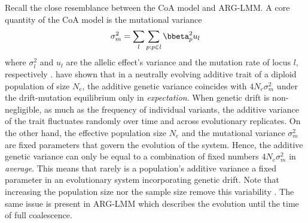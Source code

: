 Recall the close resemblance between the CoA model and ARG-LMM.
A core quantity of the CoA model is the mutational variance 
\begin{align}
\sigma_m^2 = \sum_l \sum_{p:p \in l} \bbeta_p^2 u_l
\label{eq:mutational_variance}
\end{align}
where $\sigma_l^2$ and $u_l$ are the allelic effect's variance and the mutation rate of locus $l$, respectively \citep{kimura1964numberofalleles,lynch1998quant, walsh2018evolution}.
\cite{lynch1986phenoneutral} have shown that in a neutrally evolving additive trait of a diploid population of size $N_e$,
the additive genetic variance coincides with $4N_e\sigma_m^2$  under the drift-mutation equilibrium only in \textit{expectation}.
When genetic drift is non-negligible, as much as the frequency of individual variants, the additive variance of the trait fluctuates randomly over time and across evolutionary replicates.
On the other hand, the effective population size $N_e$ and the mutational variance $\sigma_m^2$ are fixed parameters that govern the evolution of the system.
Hence, the additive genetic variance can only be equal to a combination of fixed numbers $4N_e \sigma_m^2$ in \textit{average}.
This means that rarely is a population's additive variance a fixed parameter in an evolutionary system incorporating genetic drift.
Note that increasing the population size nor the sample size remove this variability \citep{lynch1986phenoneutral}.
The same issue is present in ARG-LMM which describes the evolution until the time of full coalescence.

